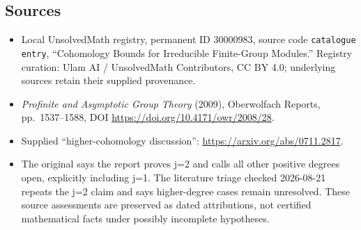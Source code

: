 \documentclass[11pt]{article}
\begin{document}
\subsection{Sources}
\begin{itemize}
\item Local UnsolvedMath registry, permanent ID \(30000983\), source code \texttt{catalogue entry}, ``Cohomology Bounds for Irreducible Finite-Group Modules.'' Registry curation: Ulam AI / UnsolvedMath Contributors, CC BY 4.0; underlying sources retain their supplied provenance.
\item \emph{Profinite and Asymptotic Group Theory} (2009), Oberwolfach Reports, pp.\ 1537--1588, DOI \url{https://doi.org/10.4171/owr/2008/28}.
\item Supplied ``higher-cohomology discussion'': \url{https://arxiv.org/abs/0711.2817}.
\item The original says the report proves j=2 and calls all other positive degrees open, explicitly including j=1. The literature triage checked 2026-08-21 repeats the j=2 claim and says higher-degree cases remain unresolved. These source assessments are preserved as dated attributions, not certified mathematical facts under possibly incomplete hypotheses.
\end{itemize}
\end{document}
